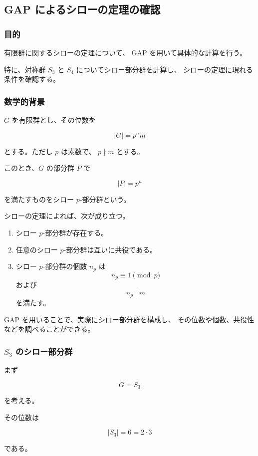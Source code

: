 \subsection{GAP によるシローの定理の確認}

\subsubsection{目的}

有限群に関するシローの定理について、
GAP を用いて具体的な計算を行う。

特に、対称群 $S_3$ と $S_4$ についてシロー部分群を計算し、
シローの定理に現れる条件を確認する。

\subsubsection{数学的背景}

$G$ を有限群とし、その位数を

\[
|G|=p^n m
\]

とする。ただし $p$ は素数で、
$p\nmid m$ とする。

このとき、$G$ の部分群 $P$ で

\[
|P|=p^n
\]

を満たすものをシロー $p$-部分群という。

シローの定理によれば、次が成り立つ。

\begin{enumerate}
  \item シロー $p$-部分群が存在する。
  \item 任意のシロー $p$-部分群は互いに共役である。
  \item シロー $p$-部分群の個数 $n_p$ は
  \[
  n_p\equiv 1\pmod p
  \]
  および
  \[
  n_p\mid m
  \]
  を満たす。
\end{enumerate}

GAP を用いることで、実際にシロー部分群を構成し、
その位数や個数、共役性などを調べることができる。

\subsubsection{$S_3$ のシロー部分群}

まず

\[
G=S_3
\]

を考える。

その位数は

\[
|S_3|=6=2\cdot3
\]

である。

